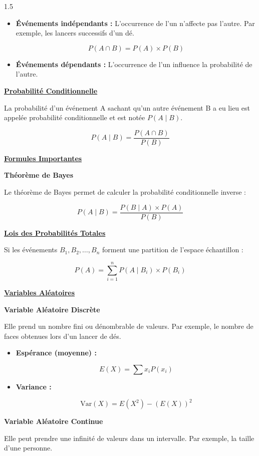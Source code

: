 \documentclass[12pt]{article}
\begin{document}
\begin{spacing}{1.5}
\begin{itemize}
    \item \textbf{Événements indépendants :} L'occurrence de l'un n'affecte pas l'autre. Par exemple, les lancers successifs d'un dé.
    
    \[
    P(A \cap B) = P(A) \times P(B)
    \]
    
    \item \textbf{Événements dépendants :} L'occurrence de l'un influence la probabilité de l'autre.
\end{itemize}

\textbf{\underline{Probabilité Conditionnelle}}

La probabilité d'un événement A sachant qu'un autre événement B a eu lieu est appelée probabilité conditionnelle et est notée \( P(A \mid B) \).

\[
P(A \mid B) = \frac{P(A \cap B)}{P(B)}
\]

\textbf{\underline{Formules Importantes}}

\textbf{Théorème de Bayes}

Le théorème de Bayes permet de calculer la probabilité conditionnelle inverse :

\[
P(A \mid B) = \frac{P(B \mid A) \times P(A)}{P(B)}
\]

\textbf{\underline{Lois des Probabilités Totales}}

Si les événements \( B_1, B_2, \dots, B_n \) forment une partition de l'espace échantillon :

\[
P(A) = \sum_{i=1}^{n} P(A \mid B_i) \times P(B_i)
\]

\textbf{\underline{Variables Aléatoires}}

\textbf{Variable Aléatoire Discrète}

Elle prend un nombre fini ou dénombrable de valeurs. Par exemple, le nombre de faces obtenues lors d'un lancer de dés.

\begin{itemize}
    \item \textbf{Espérance (moyenne) :}
    
    \[
    E(X) = \sum x_i P(x_i)
    \]
    
    \item \textbf{Variance :}
    
    \[
    \text{Var}(X) = E(X^2) - (E(X))^2
    \]
\end{itemize}

\textbf{Variable Aléatoire Continue}

Elle peut prendre une infinité de valeurs dans un intervalle. Par exemple, la taille d'une personne.


\end{spacing}
\end{document}
